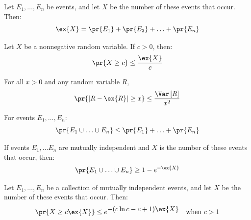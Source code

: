 \documentclass[12pt]{article}
\newcommand{\var}[1]{\Var\left[#1\right]}
\begin{document}
\newcommand{\prsub}[2]{\mathop{\textup{Pr}_{#1}}\nolimits\left(#2\right)}



\begin{theorem}
\label{th:num-events}
Let $E_1, \ldots, E_n$ be events, and let $X$ be the number of these
events that occur. Then:
%
\[
\ex{X} = \pr{E_1} + \pr{E_2} + \ldots + \pr{E_n}
\]
\end{theorem}

\begin{theorem}
\label{th:markov}
Let $X$ be a nonnegative random variable.  If $c > 0$, then:
%
\[
\pr{X \geq c} \leq \frac{\ex{X}}{c}
\]
\end{theorem}

\begin{theorem}
\label{th:chebyshev}
For all $x > 0$ and any random variable $R$,
$$\pr{|R-\ex{R}| \geq x} \leq \frac{\var{R}}{x^2}$$
\end{theorem}

\begin{theorem}
\label{th:union}
For events $E_1, \ldots, E_n$:
%
\[
\pr{E_1 \cup \ldots \cup E_n} \leq \pr{E_1} + \ldots + \pr{E_n}
\]
\end{theorem}

\begin{theorem}
\label{th:murphy}
If events $E_1, \ldots E_n$ are mutually independent and $X$ is the
number of these events that occur, then:
%
\[
\pr{E_1 \cup \ldots \cup E_n} \geq 1 - e^{-\ex{X}}
\]
\end{theorem}

\begin{theorem}
\label{th:chernoff}
Let $E_1, \ldots, E_n$ be a collection of mutually independent events,
and let $X$ be the number of these events that occur.  Then:
%
\begin{align*}
\pr{X \geq c \ex{X}} & \leq e^{\textstyle -(c \ln c - c + 1) \ex{X}}
    & \text{when $c > 1$}
\end{align*}
\end{theorem}

\end{document}
